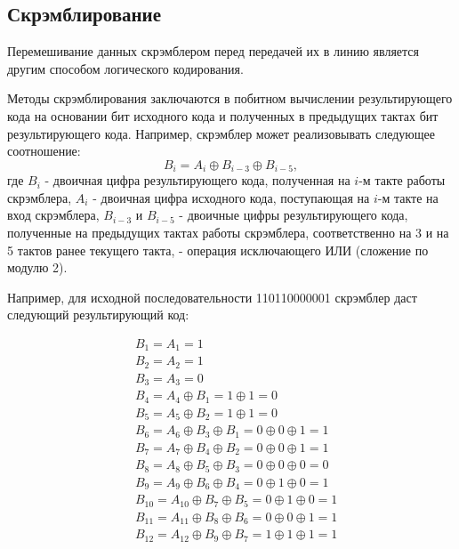 \subsection{Скрэмблирование}

Перемешивание данных скрэмблером перед передачей их в линию является другим способом логического кодирования.

Методы скрэмблирования заключаются в побитном вычислении результирующего кода на основании бит исходного кода и полученных в предыдущих тактах бит результирующего кода.
Например, скрэмблер может реализовывать следующее соотношение:
\[
    B_i = A_i \oplus B_{i-3} \oplus B_{i-5},
\]
где $B_i$ - двоичная цифра результирующего кода, полученная на $i\text{-м}$ такте работы скрэмблера, $A_i$ - двоичная цифра исходного кода, поступающая на $i\text{-м}$ такте на вход скрэмблера, $B_{i-3}$ и $B_{i-5}$ - двоичные цифры результирующего кода, полученные на предыдущих тактах работы скрэмблера, соответственно на 3 и на 5 тактов ранее текущего такта,  - операция исключающего ИЛИ (сложение по модулю 2).

Например, для исходной последовательности 110110000001 скрэмблер даст следующий результирующий код:

\begin{equation}
    \begin{aligned}
        & B_1    = A_1                          = 1 \\
        & B_2    = A_2                          = 1 \\
        & B_3    = A_3                          = 0 \\
        & B_4    = A_4    \oplus B_1            = 1 \oplus 1          = 0 \\
        & B_5    = A_5    \oplus B_2            = 1 \oplus 1          = 0 \\
        & B_6    = A_6    \oplus B_3 \oplus B_1 = 0 \oplus 0 \oplus 1 = 1 \\
        & B_7    = A_7    \oplus B_4 \oplus B_2 = 0 \oplus 0 \oplus 1 = 1 \\
        & B_8    = A_8    \oplus B_5 \oplus B_3 = 0 \oplus 0 \oplus 0 = 0 \\
        & B_9    = A_9    \oplus B_6 \oplus B_4 = 0 \oplus 1 \oplus 0 = 1 \\
        & B_{10} = A_{10} \oplus B_7 \oplus B_5 = 0 \oplus 1 \oplus 0 = 1 \\
        & B_{11} = A_{11} \oplus B_8 \oplus B_6 = 0 \oplus 0 \oplus 1 = 1 \\
        & B_{12} = A_{12} \oplus B_9 \oplus B_7 = 1 \oplus 1 \oplus 1 = 1 \\
    \end{aligned}
\end{equation}

